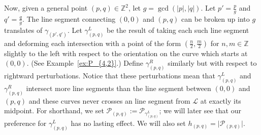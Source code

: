 \documentclass{article}
\theoremstyle{remark}
\newcommand{\calP}{\mathcal{P}}
\begin{document}
Now, given a general point $(p,q) \in \mathbb{Z}^2$, let $g = \gcd(\vert p\vert,\vert q\vert)$. Let $p' = \frac{p}{g}$ and $q' = \frac{q}{g}$. The line segment connecting $(0,0)$ and $(p,q)$ can be broken up into $g$ translates of $\gamma_{(p',q')}$. Let $\gamma^L_{(p,q)}$ be the result of taking each such line segment and deforming each intersection with a point of the form $(\frac{n}{2},\frac{m}{2})$ for $n,m \in \mathbb{Z}$ slightly to the left with respect to the orientation on the curve which starts at $(0,0)$. (See Example~\ref{ex:P_{4,2}}.) Define $\gamma^R_{(p,q)}$ similarly but with respect to rightward perturbations. Notice that these perturbations mean that $\gamma_{(p,q)}^L$ and $\gamma_{(p,q)}^R$ intersect more line segments than the line segment between $(0,0)$ and $(p,q)$ and these curves never crosses an line segment from $\mathcal{L}$ at exactly its midpoint. 
For shorthand, we set $\calP_{(p,q)} := \calP_{\gamma_{(p,q)}^L}$; we will later see that our preference for $\gamma_{(p,q)}^L$ has no lasting effect. We will also set $h_{(p,q)} = \vert \calP_{(p,q)} \vert$. 
\end{document}
